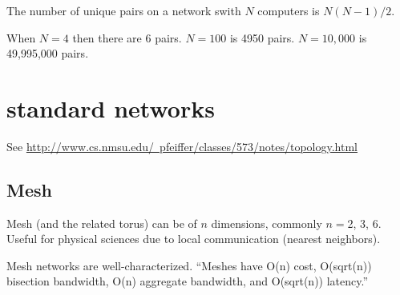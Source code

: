\documentclass[pdftex]{article}
\begin{document}
The number of unique pairs on a network swith $N$ computers is $N(N-1)/2$. 

When $N=4$ then there are 6 pairs. $N=100$ is 4950 pairs. $N=10,000$ is 49,995,000 pairs.

\section{standard networks}

See \href{http://www.cs.nmsu.edu/~pfeiffer/classes/573/notes/topology.html}{http://www.cs.nmsu.edu/~pfeiffer/classes/573/notes/topology.html}

\subsection{Mesh}
Mesh (and the related torus) can be of $n$ dimensions, commonly $n=$2, 3, 6. Useful for physical sciences due to local communication (nearest neighbors).

Mesh networks are well-characterized. ``Meshes have O(n) cost, O(sqrt(n)) bisection bandwidth, O(n) aggregate bandwidth, and O(sqrt(n)) latency.''
\end{document}
